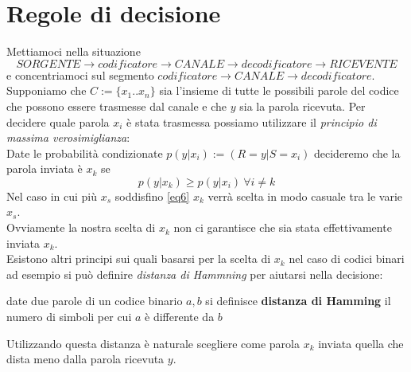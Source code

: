 \vspace{15pt}


\section{Regole di decisione}
\vspace{10pt}

Mettiamoci nella situazione
$$ SORGENTE \to codificatore \to CANALE \to decodificatore \to RICEVENTE$$
e concentriamoci sul segmento $codificatore \to CANALE \to decodificatore$.\\
Supponiamo che $C:=\{ x_1 ..x_n \}$ sia l'insieme di tutte le possibili parole del codice che possono essere trasmesse dal canale e che $y$ sia la parola ricevuta. Per decidere quale parola $x_i$ è stata trasmessa possiamo utilizzare il \textit{principio di massima verosimiglianza}:\\
Date le probabilità condizionate $p(y|x_i):=(R=y|S=x_i)$ decideremo che la parola inviata è $x_k$ se
\begin{equation} \label{eq6}
p(y|x_k )\geq p(y|x_i) \ \forall i\neq k
\end{equation}
Nel caso in cui più $x_s$ soddisfino \ref{eq6} $x_k$ verrà scelta in modo casuale tra le varie $x_s$.\\
Ovviamente la nostra scelta di $x_k$ non ci garantisce che sia stata effettivamente inviata $x_k$.\\
Esistono altri principi sui quali basarsi per la scelta di $x_k$ nel caso di codici binari ad esempio si può definire \textit{distanza di Hammning} per aiutarsi nella decisione:
\begin{defi}
date due parole di un codice binario $a,b$ si definisce \textbf{distanza di Hamming} il numero di simboli per cui $a$ è differente da $b$
\end{defi}
Utilizzando questa distanza è naturale scegliere come parola $x_k$ inviata quella che dista meno dalla parola ricevuta $y$.

